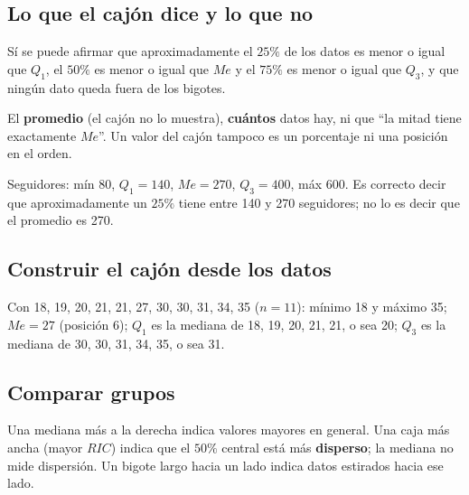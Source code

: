 \subsection{Lo que el cajón dice y lo que no}
Sí se puede afirmar que aproximadamente el $25\%$ de los datos es menor o igual que $Q_1$, el $50\%$ es menor o igual que $Me$ y el $75\%$ es menor o igual que $Q_3$, y que ningún dato queda fuera de los bigotes.
\begin{ojo} El \textbf{promedio} (el cajón no lo muestra), \textbf{cuántos} datos hay, ni que ``la mitad tiene exactamente $Me$''. Un valor del cajón tampoco es un porcentaje ni una posición en el orden.\end{ojo}
\begin{ejemplo} Seguidores: mín 80, $Q_1 = 140$, $Me = 270$, $Q_3 = 400$, máx 600. Es correcto decir que aproximadamente un $25\%$ tiene entre 140 y 270 seguidores; no lo es decir que el promedio es 270.\end{ejemplo}

\subsection{Construir el cajón desde los datos}
Con 18, 19, 20, 21, 21, 27, 30, 30, 31, 34, 35 ($n = 11$): mínimo 18 y máximo 35; $Me = 27$ (posición 6); $Q_1$ es la mediana de 18, 19, 20, 21, 21, o sea 20; $Q_3$ es la mediana de 30, 30, 31, 34, 35, o sea 31.
\begin{center}
\end{center}

\subsection{Comparar grupos}
Una mediana más a la derecha indica valores mayores en general. Una caja más ancha (mayor $RIC$) indica que el $50\%$ central está más \textbf{disperso}; la mediana no mide dispersión. Un bigote largo hacia un lado indica datos estirados hacia ese lado.

